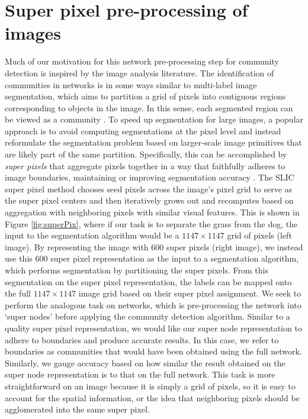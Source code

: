 \section{Super pixel pre-processing of images}
Much of our motivation for this network pre-processing step for community detection is inspired by the image analysis literature. The identification of communities in networks is in some ways similar to multi-label image segmentation, which aims to partition a grid of pixels into contiguous regions corresponding to objects in the image. In this sense, each segmented region can be viewed as a community \cite{browet}. To speed up segmentation for large images, a popular approach is to avoid computing segmentations at the pixel level and instead reformulate the segmentation problem based on larger-scale image primitives that are likely part of the same partition. Specifically, this can be accomplished by {\it super pixels} that aggregate pixels together in a way that faithfully adheres to image boundaries, maintaining or improving segmentation accuracy \cite{slic}. The SLIC super pixel method \cite{slic} chooses seed pixels across the image's pixel grid to serve as the super pixel centers and then iteratively grows out and recomputes based on aggregation with neighboring pixels with similar visual features. This is shown in Figure \ref{fig:superPix}, where if our task is to separate the grass from the dog, the input to the segmentation algorithm would be a $1147 \times 1147$ grid of pixels (left image). By representing the image with 600 super pixels (right image), we instead use this 600 super pixel representation as the input to a segmentation algorithm, which performs segmentation by partitioning the super pixels. From this segmentation on the super pixel representation, the labels can be mapped onto the full $1147 \times 1147$ image grid based on their super pixel assignment. We seek to perform the analogous task on networks, which is pre-processing the network into `super nodes' before applying the community detection algorithm. Similar to a quality super pixel representation, we would like our super node representation to adhere to boundaries and produce accurate results. In this case, we refer to boundaries as communities that would have been obtained using the full network. Similarly, we gauge accuracy based on how similar the result obtained on the super node representation is to that on the full network. This task is more straightforward on an image because it is simply a grid of pixels, so it is easy to account for the spatial information, or the idea that neighboring pixels should be agglomerated into the same super pixel. 

